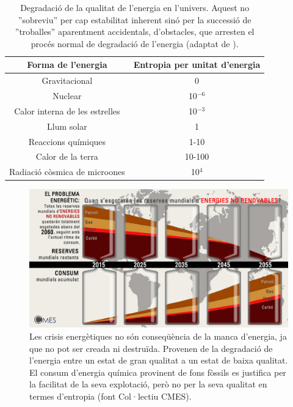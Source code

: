 \begin{table}[h!]
  \begin{center}
    \caption{Degradació de la qualitat de l'energia en l'univers. Aquest no ''sobreviu'' per cap estabilitat inherent sinó per la successió de ''troballes'' aparentment accidentals, d'obstacles, que arresten el procés normal de degradació de l'energia (adaptat de \cite{dyson_energy_1971}).}
    \label{tab:DegradacioEnergia}
       \begin{tabular}{cc}
Forma de l'energia & Entropia per unitat d'energia\\
\hline
Gravitacional & 0 \\
Nuclear & 10$^{-6}$ \\
Calor interna de les estrelles & 10$^{-3}$ \\
Llum solar & 1 \\
Reaccions químiques & 1-10 \\
Calor de la terra & 10-100 \\
Radiació còsmica de microones & 10$^4$ \\
\hline
       \end{tabular}
   \end{center}
\end{table}

\begin{figure}[h]
\centering
\includegraphics[scale=0.8]{figures/EsgotamentEnergia.png}
\caption{Les crisis energètiques no són conseqüència de la manca d'energia, ja que no pot ser creada ni destruïda. Provenen de la degradació de l'energia entre un estat de gran qualitat a un estat de baixa qualitat. El consum d'energia química provinent de fons fòssils es justifica per la facilitat de la seva explotació, però no per la seva qualitat en termes d'entropia (font Col·lectiu CMES).}
\label{fig:EsgotamentEnergia}
\end{figure}


